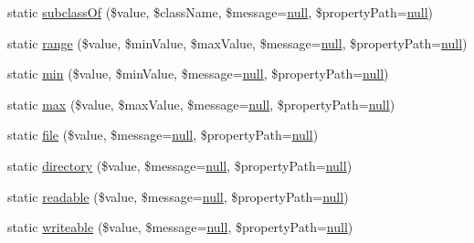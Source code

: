 \begin{DoxyCompactItemize}
static \mbox{\hyperlink{class_assert_1_1_assertion_af2c7cee866ef4853ecd1a7d0d8a212f8}{subclass\+Of}} (\$value, \$class\+Name, \$message=\mbox{\hyperlink{class_assert_1_1_assertion_af95d8b1582dd619cc0159041bc6892c5}{null}}, \$property\+Path=\mbox{\hyperlink{class_assert_1_1_assertion_af95d8b1582dd619cc0159041bc6892c5}{null}})
\item 
static \mbox{\hyperlink{class_assert_1_1_assertion_aefca05fbe8798e8f13a0c085aba8d601}{range}} (\$value, \$min\+Value, \$max\+Value, \$message=\mbox{\hyperlink{class_assert_1_1_assertion_af95d8b1582dd619cc0159041bc6892c5}{null}}, \$property\+Path=\mbox{\hyperlink{class_assert_1_1_assertion_af95d8b1582dd619cc0159041bc6892c5}{null}})
\item 
static \mbox{\hyperlink{class_assert_1_1_assertion_a27ef90eca563029c0f04a0908e609202}{min}} (\$value, \$min\+Value, \$message=\mbox{\hyperlink{class_assert_1_1_assertion_af95d8b1582dd619cc0159041bc6892c5}{null}}, \$property\+Path=\mbox{\hyperlink{class_assert_1_1_assertion_af95d8b1582dd619cc0159041bc6892c5}{null}})
\item 
static \mbox{\hyperlink{class_assert_1_1_assertion_ae215c0126f7693cab76dd2953620c6d3}{max}} (\$value, \$max\+Value, \$message=\mbox{\hyperlink{class_assert_1_1_assertion_af95d8b1582dd619cc0159041bc6892c5}{null}}, \$property\+Path=\mbox{\hyperlink{class_assert_1_1_assertion_af95d8b1582dd619cc0159041bc6892c5}{null}})
\item 
static \mbox{\hyperlink{class_assert_1_1_assertion_a5c3ccb32731105816f43d0935a9ca936}{file}} (\$value, \$message=\mbox{\hyperlink{class_assert_1_1_assertion_af95d8b1582dd619cc0159041bc6892c5}{null}}, \$property\+Path=\mbox{\hyperlink{class_assert_1_1_assertion_af95d8b1582dd619cc0159041bc6892c5}{null}})
\item 
static \mbox{\hyperlink{class_assert_1_1_assertion_aadd5fb73a4922d7e0d6f09f714976754}{directory}} (\$value, \$message=\mbox{\hyperlink{class_assert_1_1_assertion_af95d8b1582dd619cc0159041bc6892c5}{null}}, \$property\+Path=\mbox{\hyperlink{class_assert_1_1_assertion_af95d8b1582dd619cc0159041bc6892c5}{null}})
\item 
static \mbox{\hyperlink{class_assert_1_1_assertion_a5a7b2a47f368db8107396f5f9158d3b3}{readable}} (\$value, \$message=\mbox{\hyperlink{class_assert_1_1_assertion_af95d8b1582dd619cc0159041bc6892c5}{null}}, \$property\+Path=\mbox{\hyperlink{class_assert_1_1_assertion_af95d8b1582dd619cc0159041bc6892c5}{null}})
\item 
static \mbox{\hyperlink{class_assert_1_1_assertion_affb9a0c840db66c8e9cad399c7dbb7fa}{writeable}} (\$value, \$message=\mbox{\hyperlink{class_assert_1_1_assertion_af95d8b1582dd619cc0159041bc6892c5}{null}}, \$property\+Path=\mbox{\hyperlink{class_assert_1_1_assertion_af95d8b1582dd619cc0159041bc6892c5}{null}})

\end{DoxyCompactItemize}
